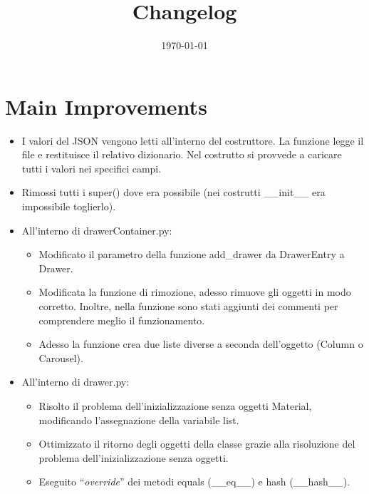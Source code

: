 \documentclass[a4paper]{article}
\newcommand{\dquotes}[1]{``#1''}
\begin{document}
	\title{Changelog}
	\date{\today}
	\maketitle
	
	\newpage
	
	\section*{Main Improvements}
	
	\begin{itemize}[label=]
		\item I valori del \textsf{JSON} vengono letti all'interno del costruttore. La funzione legge il file e restituisce il relativo dizionario. Nel costrutto si provvede a caricare tutti i valori nei specifici campi.
		
		\item Rimossi tutti i \textsf{super()} dove era possibile (nei costrutti \textsf{\_\_init\_\_} era impossibile toglierlo).
		
		\item All'interno di \textsf{drawerContainer.py}:
			\begin{itemize}
				\item Modificato il parametro della funzione add\_drawer da \textsf{DrawerEntry} a \textsf{Drawer}.
				
				\item Modificata la funzione di rimozione, adesso rimuove gli oggetti in modo corretto. Inoltre, nella funzione sono stati aggiunti dei commenti per comprendere meglio il funzionamento.
				
				\item Adesso la funzione crea due liste diverse a seconda dell'oggetto (\textsf{Column} o \textsf{Carousel}).
			\end{itemize}
		
		\item All'interno di \textsf{drawer.py}:
			\begin{itemize}
				\item Risolto il problema dell'inizializzazione senza oggetti \textsf{Material}, modificando l'assegnazione della variabile \textsf{list}.
				
				\item Ottimizzato il ritorno degli oggetti della classe grazie alla risoluzione del problema dell'inizializzazione senza oggetti.
				
				\item Eseguito \dquotes{\emph{override}} dei metodi \textsf{equals (\_\_eq\_\_)} e \textsf{hash (\_\_hash\_\_)}.
			\end{itemize}
		

\end{itemize}
\end{document}
